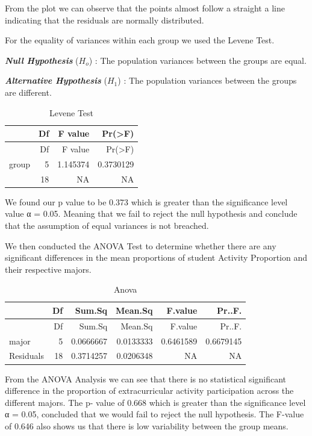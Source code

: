 \documentclass[
  letterpaper,
  DIV=11,
  numbers=noendperiod]{scrartcl}
\begin{document}
From the plot we can observe that the points almost follow a straight a
line indicating that the residuals are normally distributed.

For the equality of variances within each group we used the Levene Test.

\textbf{\emph{Null Hypothesis}} (\(H_{o}\)) : The population variances
between the groups are equal.

\textbf{\emph{Alternative Hypothesis}} (\(H_{1}\)) : The population
variances between the groups are different.

\begin{longtable}[]{@{}lrrr@{}}
\caption{Levene Test}\tabularnewline
\toprule\noalign{}
& Df & F value & Pr(\textgreater F) \\
\midrule\noalign{}
\endfirsthead
\toprule\noalign{}
& Df & F value & Pr(\textgreater F) \\
\midrule\noalign{}
\endhead
\bottomrule\noalign{}
\endlastfoot
group & 5 & 1.145374 & 0.3730129 \\
& 18 & NA & NA \\
\end{longtable}

We found our p value to be 0.373 which is greater than the significance
level value α = 0.05. Meaning that we fail to reject the null hypothesis
and conclude that the assumption of equal variances is not breached.

We then conducted the ANOVA Test to determine whether there are any
significant differences in the mean proportions of student Activity
Proportion and their respective majors.

\begin{longtable}[]{@{}lrrrrr@{}}
\caption{Anova}\tabularnewline
\toprule\noalign{}
& Df & Sum.Sq & Mean.Sq & F.value & Pr..F. \\
\midrule\noalign{}
\endfirsthead
\toprule\noalign{}
& Df & Sum.Sq & Mean.Sq & F.value & Pr..F. \\
\midrule\noalign{}
\endhead
\bottomrule\noalign{}
\endlastfoot
major & 5 & 0.0666667 & 0.0133333 & 0.6461589 & 0.6679145 \\
Residuals & 18 & 0.3714257 & 0.0206348 & NA & NA \\
\end{longtable}

From the ANOVA Analysis we can see that there is no statistical
significant difference in the proportion of extracurricular activity
participation across the different majors. The p- value of 0.668 which
is greater than the significance level α = 0.05, concluded that we would
fail to reject the null hypothesis. The F-value of 0.646 also shows us
that there is low variability between the group means.
\end{document}
